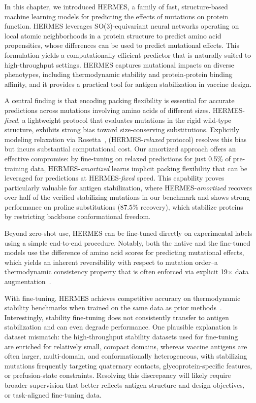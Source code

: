 In this chapter, we introduced HERMES, a family of fast, structure-based machine learning models for predicting the
effects of mutations on protein function. HERMES leverages SO(3)-equivariant neural networks
operating on local atomic neighborhoods in a protein structure to predict amino acid propensities,
whose differences can be used to predict mutational effects. This formulation yields a
computationally efficient predictor that is naturally suited to high-throughput settings. HERMES
captures mutational impacts on diverse phenotypes, including thermodynamic stability and
protein-protein binding affinity, and it provides a practical tool for antigen stabilization in
vaccine design.

A central finding is that encoding packing flexibility is essential for accurate predictions across
mutations involving amino acids of different sizes. HERMES-{\em fixed}, a lightweight protocol that
evaluates mutations in the rigid wild-type structure, exhibits strong bias toward size-conserving
substitutions. Explicitly modeling relaxation via Rosetta~\citep{chaudhury_pyrosetta_2010},
(HERMES-{\em relaxed} protocol) resolves this bias but incurs substantial computational cost. Our
amortized approach offers an effective compromise: by fine-tuning on relaxed predictions for just
0.5\% of pre-training data, HERMES-{\em amortized} learns implicit packing flexibility that can be
leveraged for predictions at HERMES-{\em fixed} speed. This capability proves particularly valuable
for antigen stabilization, where HERMES-{\em amortized} recovers over half of the verified
stabilizing mutations in our benchmark and shows strong performance on proline substitutions (87.5\%
recovery), which stabilize proteins by restricting backbone conformational freedom.

Beyond zero-shot use, HERMES can be fine-tuned directly on experimental labels using a simple
end-to-end procedure. Notably, both the native and the fine-tuned models use the difference of amino
acid scores for predicting mutational effects, which yields an inherent reversibility with respect
to mutation order--a thermodynamic consistency property that is often enforced via explicit
19$\times$ data augmentation~\citep{diaz_stability_2024}.

With fine-tuning, HERMES achieves competitive accuracy on thermodynamic stability benchmarks when
trained on the same data as prior methods~\citep{blaabjerg_rapid_2023, diaz_stability_2024,
dieckhaus_transfer_2024}. Interestingly, stability fine-tuning does not consistently transfer to
antigen stabilization and can even degrade performance. One plausible explanation is dataset
mismatch: the high-throughput stability datasets used for
fine-tuning~\citep{tsuboyama_mega-scale_2023} are enriched for relatively small, compact domains,
whereas vaccine antigens are often larger, multi-domain, and conformationally heterogeneous, with
stabilizing mutations frequently targeting quaternary contacts, glycoprotein-specific features, or
prefusion-state constraints. Resolving this discrepancy will likely require broader supervision that
better reflects antigen structure and design objectives, or task-aligned fine-tuning data.

